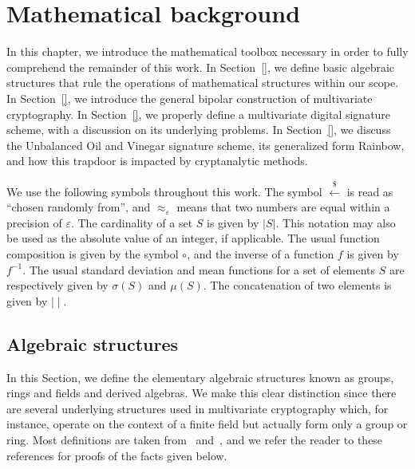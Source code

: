 \documentclass[draft, 12pt, a4paper, oneside]{memoir}
\newcommand{\random}{\stackrel{\$}{\longleftarrow}}
\theoremstyle{definition}
\theoremstyle{remark}
\begin{document}

\chapter{Mathematical background}\label{chapter:math}

In this chapter, we introduce the mathematical toolbox necessary in order to fully comprehend the remainder of this work. In Section~\ref{}, we define basic algebraic structures that rule the operations of mathematical structures within our scope. In Section~\ref{}, we introduce the general bipolar construction of multivariate cryptography. In Section~\ref{}, we properly define a multivariate digital signature scheme, with a discussion on its underlying problems. In Section~\ref{}, we discuss the Unbalanced Oil and Vinegar signature scheme, its generalized form Rainbow, and how this trapdoor is impacted by cryptanalytic methods.

We use the following symbols throughout this work. The symbol $\random{}$ is read as ``chosen randomly from'', and $\approx_{\varepsilon}$ means that two numbers are equal within a precision of $\varepsilon$. The cardinality of a set $S$ is given by $|S|$. This notation may also be used as the absolute value of an integer, if applicable. The usual function composition is given by the symbol $\circ$, and the inverse of a function $f$ is given by $f^{-1}$. The usual standard deviation and mean functions for a set of elements $S$ are respectively given by $\sigma(S)$ and $\mu(S)$. The concatenation of two elements is given by $\mid \mid$.

\section{Algebraic structures}\label{sec:algebra}

In this Section, we define the elementary algebraic structures known as groups, rings and fields and derived algebras. We make this clear distinction since there are several underlying structures used in multivariate cryptography which, for instance, operate on the context of a finite field but actually form only a group or ring. Most definitions are taken from~\cite{} and~\cite{}, and we refer the reader to these references for proofs of the facts given below.
\end{document}

